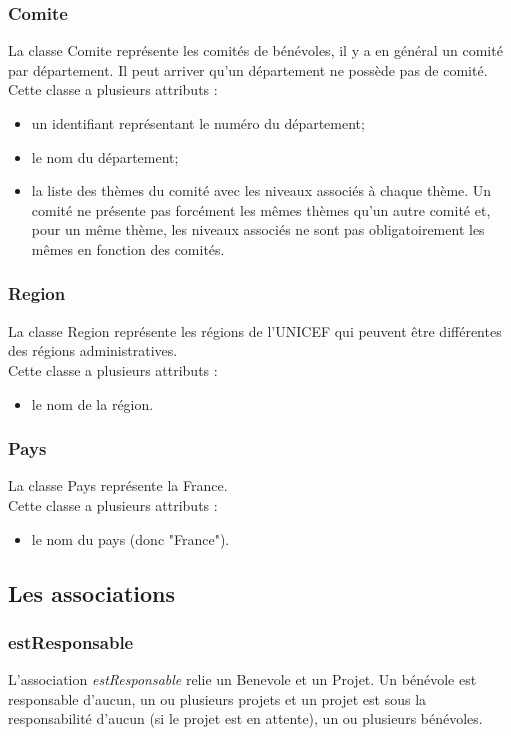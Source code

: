 \subsubsection*{Comite}

La classe Comite représente les comités de bénévoles, il y a en général un comité par département. Il peut arriver qu'un département ne possède pas de comité.\\
Cette classe a plusieurs attributs :
\begin{itemize}
\item un identifiant représentant le numéro du département;
\item le nom du département;
\item la liste des thèmes du comité avec les niveaux associés à chaque thème. Un comité ne présente pas forcément les mêmes thèmes qu'un autre comité et, pour un même thème, les niveaux associés ne sont pas obligatoirement les mêmes en fonction des comités. 
\end{itemize}

\subsubsection*{Region}

La classe Region représente les régions de l'UNICEF qui peuvent être différentes des régions administratives.\\
Cette classe a plusieurs attributs :
\begin{itemize}
\item le nom de la région.
\end{itemize}

\subsubsection*{Pays}

La classe Pays représente la France.\\
Cette classe a plusieurs attributs :
\begin{itemize}
\item le nom du pays (donc "France").
\end{itemize}


\subsection{Les associations}

\subsubsection*{estResponsable}
L'association \textit{estResponsable} relie un Benevole et un Projet. Un bénévole est responsable d'aucun, un ou plusieurs projets et un projet est sous la responsabilité d'aucun (si le projet est en attente), un ou plusieurs bénévoles.

